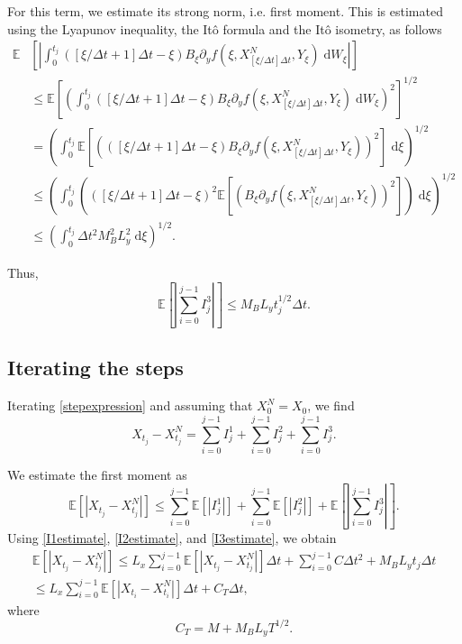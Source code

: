 \documentclass[reqno,12pt]{amsart}
\theoremstyle{plain}%
\theoremstyle{definition}
\begin{document}
For this term, we estimate its strong norm, i.e. first moment. This is estimated using the Lyapunov inequality, the It\^o formula and the It\^o isometry, as follows
\begin{align*}
  \mathbb{E}&\left[ \left| \int_0^{t_j} \left([\xi/\Delta t + 1]\Delta t - \xi\right) B_\xi \partial_y f(\xi, X_{[\xi/\Delta t]\Delta t}^N, Y_\xi) \;\mathrm{d}W_\xi\right| \right] \\
   & \leq \mathbb{E}\left[ \left( \int_0^{t_j} \left([\xi/\Delta t + 1]\Delta t - \xi\right) B_\xi \partial_y f(\xi, X_{[\xi/\Delta t]\Delta t}^N, Y_\xi)\;\mathrm{d}W_\xi \right)^2 \right]^{1/2} \\
   & =  \left(\int_0^{t_j} \mathbb{E}\left[ \left(\left([\xi/\Delta t + 1]\Delta t - \xi\right) B_\xi \partial_y f(\xi, X_{[\xi/\Delta t]\Delta t}^N, Y_\xi)\right)^2 \right]\;\mathrm{d}\xi \right)^{1/2}\\
   & \leq \left(\int_0^{t_j} \left(\left([\xi/\Delta t + 1]\Delta t - \xi\right)^2\mathbb{E}\left[ \left( B_\xi \partial_y f(\xi, X_{[\xi/\Delta t]\Delta t}^N, Y_\xi)\right)^2 \right]\right) \;\mathrm{d}\xi \right)^{1/2}\\
   & \leq \left(\int_0^{t_j} \Delta t^2 M_B^2 L_y^2 \;\mathrm{d}\xi \right)^{1/2}.
\end{align*}

Thus,
\begin{equation}
  \label{I3estimate}
  \mathbb{E}\left[ \left| \sum_{i=0}^{j-1} I_j^3 \right| \right] \leq M_B L_y t_j^{1/2} \Delta t.
\end{equation}

\subsection{Iterating the steps}

Iterating \eqref{stepexpression} and assuming that $X_0^N = X_0$, we find
\begin{equation}
  \label{iteratedexpression}
  X_{t_j} - X_{t_j}^N = \sum_{i=0}^{j-1} I_j^1 + \sum_{i=0}^{j-1} I_j^2 + \sum_{i=0}^{j-1} I_j^3.
\end{equation}

We estimate the first moment as
\begin{equation}
 \mathbb{E}\left[| X_{t_j} - X_{t_j}^N |\right] \leq \sum_{i=0}^{j-1} \mathbb{E}\left[| I_j^1|\right] + \sum_{i=0}^{j-1} \mathbb{E}\left[|I_j^2 |\right] + \mathbb{E}\left[ \left| \sum_{i=0}^{j-1} I_j^3 \right| \right].
\end{equation}
Using \eqref{I1estimate}, \eqref{I2estimate}, and \eqref{I3estimate}, we obtain
\begin{multline}
\label{iteratedestimate}
 \mathbb{E}\left[| X_{t_j} - X_{t_j}^N |\right] \leq L_x \sum_{i=0}^{j-1} \mathbb{E}\left[|X_{t_j} - X_{t_j}^N|\right]\Delta t + \sum_{i=0}^{j-1} C\Delta t^2 + M_B L_y t_j \Delta t \\
 \leq L_x \sum_{i=0}^{j-1} \mathbb{E}\left[|X_{t_i} - X_{t_i}^N|\right]\Delta t + C_T \Delta t,
\end{multline}
where
$$
C_T = M + M_B L_yT^{1/2}.
$$
\end{document}
